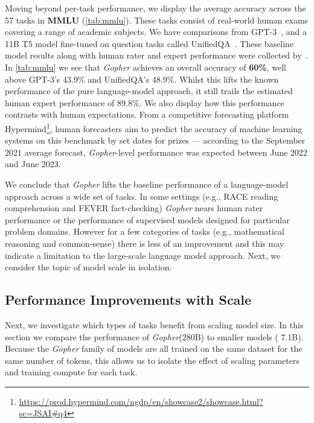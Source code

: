 \documentclass[11pt, a4paper, logo, internal, copyright, nonumbering]{deepmind}
\newcommand{\gopher}{\textit{Gopher}\xspace}
\begin{document}
Moving beyond per-task performance, we display the average accuracy across the 57 tasks in \textbf{MMLU} (\autoref{tab:mmlu}). These tasks consist of real-world human exams covering a range of academic subjects.
We have comparisons from GPT-3~\citep{gpt3}, and a 11B T5 model fine-tuned on question tasks called UnifiedQA~\citep{khashabi2020unifiedqa}. These baseline model results along with human rater and expert performance were collected by~\citet{hendrycks2020measuring}. In \autoref{tab:mmlu} we see that \gopher achieves an overall accuracy of \textbf{60\%}, well above GPT-3's 43.9\% and UnifiedQA's 48.9\%.
Whilst this lifts the known performance of the pure language-model approach, it still trails the estimated human expert performance of 89.8\%. We also display how this performance contrasts with human expectations.
From a competitive forecasting platform Hypermind\footnote{\url{https://prod.hypermind.com/ngdp/en/showcase2/showcase.html?sc=JSAI\#q4}}, human forecasters aim to predict the accuracy of machine learning systems on this benchmark by set dates for prizes --- according to the September 2021 average forecast, \gopher-level performance was expected between June 2022 and June 2023.


We conclude that \gopher lifts the baseline performance of a language-model approach across a wide set of tasks. In some settings (e.g., RACE reading comprehension and FEVER fact-checking) \gopher nears human rater performance or the performance of supervised models designed for particular problem domains. However for a few categories of tasks (e.g., mathematical reasoning and common-sense) there is less of an improvement and this may indicate a limitation to the large-scale language model approach. Next, we consider the topic of model scale in isolation.


\subsection{Performance Improvements with Scale}
Next, we investigate which types of tasks benefit from scaling model size. In this section we compare the performance of \gopher (280B) to smaller models ( 7.1B). Because the \gopher family of models are all trained on the same dataset for the same number of tokens, this allows us to isolate the effect of scaling parameters and training compute for each task.   
\end{document}
